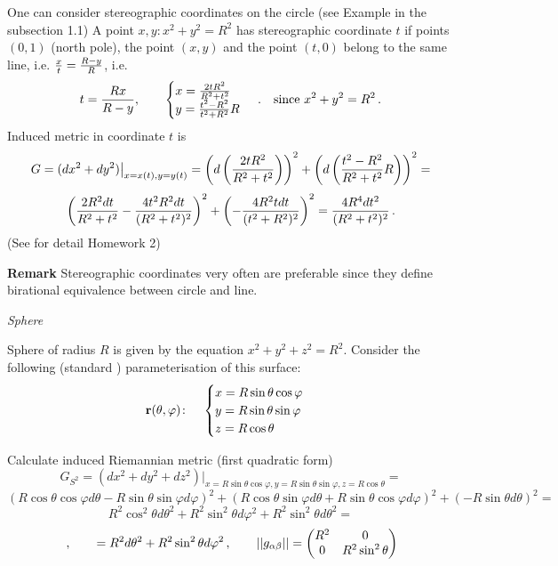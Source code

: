 \documentclass[12pt]{article}
\theoremstyle{theorem}
\numberwithin{equation}{section}
\begin{document}
One can consider stereographic coordinates on the circle (see Example in the subsection 1.1)
A point $x,y\colon x^2+y^2=R^2$ has stereographic coordinate $t$ if points $(0,1)$ (north pole),
the point $(x,y)$ and the point $(t,0)$ belong to the same line, i.e.
     ${x\over t}={R-y\over R}$, i.e.
              $$
     t={Rx\over R-y}, \qquad \begin{cases}
      x={2tR^2\over R^2+t^2}\cr
      y={t^2-R^2\over t^2+R^2}R\cr
      \end{cases}\,. \quad{\rm since\,\,} x^2+y^2=R^2\,.
                   $$
 Induced metric in coordinate $t$ is
               $$
                       G=(dx^2+dy^2)\big\vert_{x=x(t),y=y(t)}=
\left(d\left(2tR^2\over R^2+t^2\right)\right)^2+
         \left(d\left({t^2-R^2\over R^2+t^2}R\right)\right)^2=
         $$
         $$
       \left({2R^2dt\over R^2+t^2}-{4t^2R^2dt\over (R^2+t^2)^2}\right)^2+
         \left(-{4R^2 tdt\over (t^2+R^2)^2}\right)^2=
         {4R^4dt^2\over (R^2+t^2)^2}\,.
               $$
(See for detail Homework 2)

{\bf Remark} Stereographic coordinates very often are preferable since
 they define birational equivalence between circle and line.


\m

 \centerline {\it Sphere}
  Sphere of radius $R$ is given by the
equation $x^2+y^2+z^2=R^2$. Consider the following
(standard ) parameterisation
 of this surface:
\begin{equation}\label{surfacesphere}
  {\bf r}(\theta,\varphi)\colon\quad
  \begin{cases}
  x=R\sin\theta\cos\varphi\\
  y=R\sin\theta\sin\varphi\\
  z=R\cos\theta\\
  \end{cases}
\end{equation}

\medskip

   Calculate induced Riemannian metric (first quadratic form)
              $$
              G_{S^2}=\left(dx^2+dy^2+dz^2\right)
              \big\vert_{x=R\sin\theta\cos\varphi,y=R\sin\theta\sin\varphi,
              z=R\cos\theta}=
                      $$
                      $$
                      (R\cos\theta\cos\varphi d\theta-R\sin\theta\sin\varphi d\varphi)^2+
                      (R\cos\theta\sin\varphi d\theta+R\sin\theta\cos\varphi d\varphi)^2+
                         (-R\sin\theta d\theta)^2=
                      $$
                      $$
          R^2\cos^2\theta d\theta^2+R^2\sin^2\theta d\varphi^2+R^2\sin^2\theta d\theta^2=
                      $$
        \begin{equation}\label{firtsquadraticformforsphere(diff)}\,,\qquad
             =R^2d\theta^2+R^2\sin^2\theta d\varphi^2\,,\qquad
                        ||g_{\alpha\beta}||=
   \begin{pmatrix}
   R^2 & 0 \\
   0&  R^2\sin^2\theta \\
   \end{pmatrix}
                       \end{equation}
\end{document}
